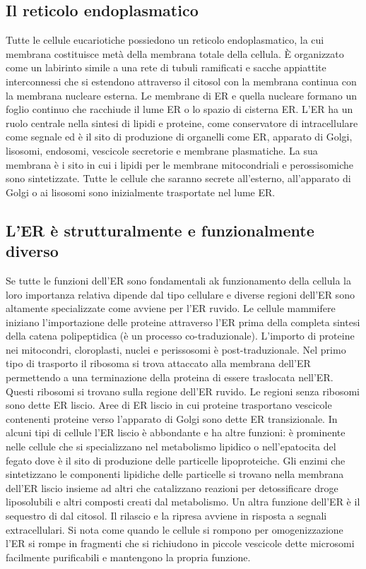\subsection{Il reticolo endoplasmatico}
Tutte le cellule eucariotiche possiedono un reticolo endoplasmatico, la cui membrana costituisce met\`a della membrana totale della cellula. \`E organizzato come un labirinto simile a 
una rete di tubuli ramificati e sacche appiattite interconnessi che si estendono attraverso il citosol con la membrana continua con la membrana nucleare esterna. Le membrane di ER e 
quella nucleare formano un foglio continuo che racchiude il lume ER o lo spazio di cisterna ER. L'ER ha un ruolo centrale nella sintesi di lipidi e proteine, come conservatore di
 intracellulare come segnale ed \`e il sito di produzione di organelli come ER, apparato di Golgi, lisosomi, endosomi, vescicole secretorie e membrane plasmatiche. 
La sua membrana \`e i sito in cui i lipidi per le membrane mitocondriali e perossisomiche sono sintetizzate. Tutte le cellule che saranno secrete all'esterno, all'apparato di Golgi o ai
lisosomi sono inizialmente trasportate nel lume ER.
\subsection{L'ER \`e strutturalmente e funzionalmente diverso}
Se tutte le funzioni dell'ER sono fondamentali ak funzionamento della cellula la loro importanza relativa dipende dal tipo cellulare e diverse regioni dell'ER sono altamente 
specializzate come avviene per l'ER ruvido. Le cellule mammifere iniziano l'importazione delle proteine attraverso l'ER prima della completa sintesi della catena polipeptidica (\`e un
processo co-traduzionale). L'importo di proteine nei mitocondri, cloroplasti, nuclei e perissosomi \`e post-traduzionale. Nel primo tipo di trasporto il ribosoma si trova attaccato alla
membrana dell'ER permettendo a una terminazione della proteina di essere traslocata nell'ER. Questi ribosomi si trovano sulla regione dell'ER ruvido. Le regioni senza ribosomi sono 
dette ER liscio. Aree di ER liscio in cui proteine trasportano vescicole contenenti proteine verso l'apparato di Golgi sono dette ER transizionale. In alcuni tipi di cellule l'ER liscio
\`e abbondante e ha altre funzioni: \`e prominente nelle cellule che si specializzano nel metabolismo lipidico o nell'epatocita del fegato dove \`e il sito di produzione delle 
particelle lipoproteiche. Gli enzimi che sintetizzano le componenti lipidiche delle particelle si trovano nella membrana dell'ER liscio insieme ad altri che catalizzano reazioni per
detossificare droge liposolubili e altri composti creati dal metabolismo. Un altra funzione dell'ER \`e il sequestro di  dal citosol. Il rilascio e la ripresa avviene in
risposta a segnali extracellulari. Si nota come quando le cellule si rompono per omogenizzazione l'ER si rompe in fragmenti che si richiudono in piccole vescicole dette microsomi 
facilmente purificabili e mantengono la propria funzione. 
